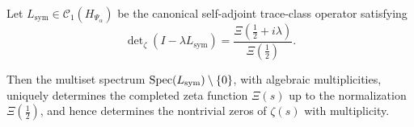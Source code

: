 \begin{corollary}
\label{cor:spectrum_determines_zeta}
Let \( L_{\mathrm{sym}} \in \mathcal{C}_1(H_{\Psi_\alpha}) \) be the canonical self-adjoint trace-class operator satisfying
\[
\det\nolimits_\zeta(I - \lambda L_{\mathrm{sym}}) = \frac{\Xi(\tfrac{1}{2} + i\lambda)}{\Xi(\tfrac{1}{2})}.
\]

Then the multiset spectrum \( \operatorname{Spec}(L_{\mathrm{sym}}) \setminus \{0\} \), with algebraic multiplicities, uniquely determines the completed zeta function \( \Xi(s) \) up to the normalization \( \Xi(\tfrac{1}{2}) \), and hence determines the nontrivial zeros of \( \zeta(s) \) with multiplicity.
\end{corollary}
%  